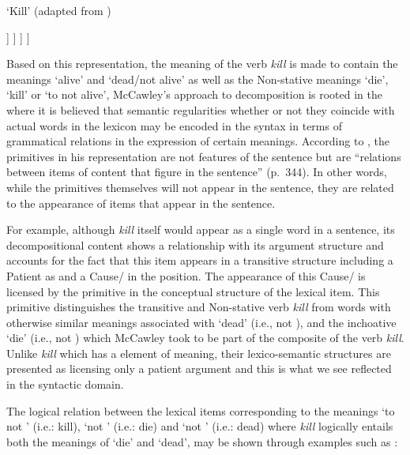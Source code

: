 \ea
\label{ex:4:11}
`Kill' (adapted from \citealt[73]{McCawley1968})\\
\begin{forest}
[S
  [\CAUSE] [x,before computing xy={s/.average={s}{siblings}}] [S
	    [\BECOME] [S
			[not] [S
				[alive] [x]
				]
			]
	  ]
]
\end{forest}
\z

Based on this representation, the meaning of the verb \textit{kill} is made
to contain the  meanings `alive' and `dead\slash not alive' as well
as the Non-stative meanings `die', `kill' or `\CAUSE to \BECOME not
alive',  McCawley’s approach to decomposition is rooted in the
 where it is believed that semantic
regularities whether or not they coincide with actual words in the
lexicon may be encoded in the syntax in terms of grammatical relations
in the expression of certain meanings.  According to
\citet{McCawley1973}, the primitives in his representation are not
features of the sentence but are ``relations between items of content
that figure in the sentence” (p.~344).  In other words, while the
primitives themselves will not appear in the sentence, they are
related to the appearance of items that appear in the sentence.

For example, although \textit{kill} itself would appear as a single word in a 
sentence, its decompositional content shows a relationship with its
argument structure and accounts for the fact that this item appears in
a transitive structure including a Patient as  and a
Cause\slash {} in the  position.  The appearance of this
Cause\slash {} is licensed by the \CAUSE primitive in the conceptual
structure of the lexical item.  This primitive distinguishes the
transitive and Non-stative verb \textit{kill} from words with otherwise
similar meanings associated with `dead' (i.e., not \ALIVE), and the
inchoative `die' (i.e., \BECOME not \ALIVE) which McCawley took to be
part of the composite of the verb \textit{kill}.  Unlike \textit{kill} which has a
 element of meaning, their lexico-semantic structures are
presented as licensing only a patient argument and this is what we see
reflected in the syntactic domain.

The logical relation between the lexical items corresponding to the
meanings `\CAUSE to \BECOME not \ALIVE' (i.e.: kill), `\BECOME not \ALIVE'
(i.e.: die) and `not \ALIVE' (i.e.: dead) where \textit{kill} logically
entails both the meanings of `die' and `dead', may be shown through
examples such as :

